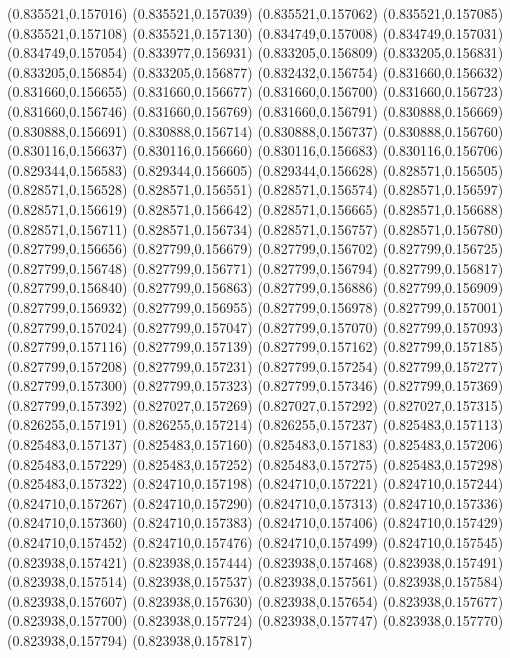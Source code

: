 (0.835521,0.157016)
(0.835521,0.157039)
(0.835521,0.157062)
(0.835521,0.157085)
(0.835521,0.157108)
(0.835521,0.157130)
(0.834749,0.157008)
(0.834749,0.157031)
(0.834749,0.157054)
(0.833977,0.156931)
(0.833205,0.156809)
(0.833205,0.156831)
(0.833205,0.156854)
(0.833205,0.156877)
(0.832432,0.156754)
(0.831660,0.156632)
(0.831660,0.156655)
(0.831660,0.156677)
(0.831660,0.156700)
(0.831660,0.156723)
(0.831660,0.156746)
(0.831660,0.156769)
(0.831660,0.156791)
(0.830888,0.156669)
(0.830888,0.156691)
(0.830888,0.156714)
(0.830888,0.156737)
(0.830888,0.156760)
(0.830116,0.156637)
(0.830116,0.156660)
(0.830116,0.156683)
(0.830116,0.156706)
(0.829344,0.156583)
(0.829344,0.156605)
(0.829344,0.156628)
(0.828571,0.156505)
(0.828571,0.156528)
(0.828571,0.156551)
(0.828571,0.156574)
(0.828571,0.156597)
(0.828571,0.156619)
(0.828571,0.156642)
(0.828571,0.156665)
(0.828571,0.156688)
(0.828571,0.156711)
(0.828571,0.156734)
(0.828571,0.156757)
(0.828571,0.156780)
(0.827799,0.156656)
(0.827799,0.156679)
(0.827799,0.156702)
(0.827799,0.156725)
(0.827799,0.156748)
(0.827799,0.156771)
(0.827799,0.156794)
(0.827799,0.156817)
(0.827799,0.156840)
(0.827799,0.156863)
(0.827799,0.156886)
(0.827799,0.156909)
(0.827799,0.156932)
(0.827799,0.156955)
(0.827799,0.156978)
(0.827799,0.157001)
(0.827799,0.157024)
(0.827799,0.157047)
(0.827799,0.157070)
(0.827799,0.157093)
(0.827799,0.157116)
(0.827799,0.157139)
(0.827799,0.157162)
(0.827799,0.157185)
(0.827799,0.157208)
(0.827799,0.157231)
(0.827799,0.157254)
(0.827799,0.157277)
(0.827799,0.157300)
(0.827799,0.157323)
(0.827799,0.157346)
(0.827799,0.157369)
(0.827799,0.157392)
(0.827027,0.157269)
(0.827027,0.157292)
(0.827027,0.157315)
(0.826255,0.157191)
(0.826255,0.157214)
(0.826255,0.157237)
(0.825483,0.157113)
(0.825483,0.157137)
(0.825483,0.157160)
(0.825483,0.157183)
(0.825483,0.157206)
(0.825483,0.157229)
(0.825483,0.157252)
(0.825483,0.157275)
(0.825483,0.157298)
(0.825483,0.157322)
(0.824710,0.157198)
(0.824710,0.157221)
(0.824710,0.157244)
(0.824710,0.157267)
(0.824710,0.157290)
(0.824710,0.157313)
(0.824710,0.157336)
(0.824710,0.157360)
(0.824710,0.157383)
(0.824710,0.157406)
(0.824710,0.157429)
(0.824710,0.157452)
(0.824710,0.157476)
(0.824710,0.157499)
(0.824710,0.157545)
(0.823938,0.157421)
(0.823938,0.157444)
(0.823938,0.157468)
(0.823938,0.157491)
(0.823938,0.157514)
(0.823938,0.157537)
(0.823938,0.157561)
(0.823938,0.157584)
(0.823938,0.157607)
(0.823938,0.157630)
(0.823938,0.157654)
(0.823938,0.157677)
(0.823938,0.157700)
(0.823938,0.157724)
(0.823938,0.157747)
(0.823938,0.157770)
(0.823938,0.157794)
(0.823938,0.157817)
